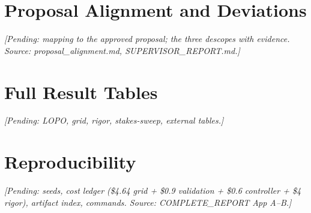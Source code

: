 \chapter{Proposal Alignment and Deviations}
\label{app:proposal}
\emph{[Pending: mapping to the approved proposal; the three descopes with evidence.
Source: proposal\_alignment.md, SUPERVISOR\_REPORT.md.]}
\chapter{Full Result Tables}
\label{app:tables}
\emph{[Pending: LOPO, grid, rigor, stakes-sweep, external tables.]}
\chapter{Reproducibility}
\label{app:repro}
\emph{[Pending: seeds, cost ledger (\$4.64 grid + \$0.9 validation + \$0.6 controller + \$4 rigor),
artifact index, commands. Source: COMPLETE\_REPORT App A--B.]}
